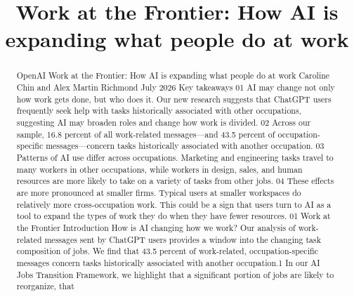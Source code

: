 \title{Work at the Frontier: How AI is expanding what people do at work}

\maketitle

\begin{abstract}
OpenAI Work at the Frontier: How AI is expanding what people do at work Caroline Chin and Alex Martin Richmond July 2026 Key takeaways 01 AI may change not only how work gets done, but who does it. Our new research suggests that ChatGPT users frequently seek help with tasks historically associated with other occupations, suggesting AI may broaden roles and change how work is divided. 02 Across our sample, 16.8 percent of all work-related messages—and 43.5 percent of occupation-specific messages—concern tasks historically associated with another occupation. 03 Patterns of AI use differ across occupations. Marketing and engineering tasks travel to many workers in other occupations, while workers in design, sales, and human resources are more likely to take on a variety of tasks from other jobs. 04 These effects are more pronounced at smaller firms. Typical users at smaller workspaces do relatively more cross-occupation work. This could be a sign that users turn to AI as a tool to expand the types of work they do when they have fewer resources. 01 Work at the Frontier Introduction How is AI changing how we work? Our analysis of work-related messages sent by ChatGPT users provides a window into the changing task composition of jobs. We find that 43.5 percent of work-related, occupation-specific messages concern tasks historically associated with another occupation.1 In our AI Jobs Transition Framework, we highlight that a significant portion of jobs are likely to reorganize, that
\end{abstract}

